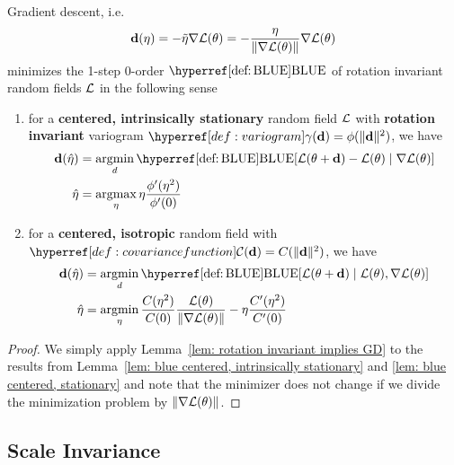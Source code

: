 \begin{theorem}\label{thm: bayesian descent}
	Gradient descent, i.e. 
	\begin{equation*}
		\mathbf{d}(\eta) = - \tilde{\eta} \nabla\mathcal{L}(\theta)
		= - \frac{\eta}{\|\nabla\mathcal{L}(\theta)\|} \nabla\mathcal{L}(\theta)
	\end{equation*}
	minimizes the 1-step 0-order \(\BLUE\) of rotation invariant random fields
	\(\mathcal{L}\) in the following sense
	\begin{enumerate}
		\item for a \textbf{centered, intrinsically stationary} random field
		\(\mathcal{L}\) with \textbf{rotation invariant} variogram \(\variogram(\step) =
		\phi(\|\step\|^2)\), we have
		\begin{align*}
			\step(\hat{\lr})
			&= \argmin_{d}
			\BLUE[\Loss(\param + \step) - \Loss(\param)\mid \nabla\Loss(\param)]\\
			\hat{\lr}
			&= \argmax_{\lr} \lr\frac{\phi'(\lr^2)}{\phi'(0)}
		\end{align*}


		\item for a \textbf{centered, isotropic} random field with
		\(\C(\step)=C(\|\step\|^2)\), we have
		\begin{align*}
			\step(\hat{\lr})
			&= \argmin_{d}
			\BLUE[\Loss(\param + \step)\mid \Loss(\param), \nabla\Loss(\param)]\\
			\hat{\lr}
			&= \argmin_{\lr}\frac{\sqC(\lr^2)}{\sqC(0)} \frac{\Loss(\param)}{\|\nabla\Loss(\param)\|}
		-  \lr\frac{\sqC'(\lr^2)}{\sqC'(0)}
		\end{align*}
	\end{enumerate}
\end{theorem}

\begin{proof}
	We simply apply Lemma~\ref{lem: rotation invariant implies GD}	to the results
	from Lemma~\ref{lem: blue centered, intrinsically stationary} and \ref{lem:
	blue centered, stationary} and note that the minimizer does not change if
	we divide the minimization problem by \(\|\nabla\mathcal{L}(\theta)\|\).
\end{proof}

\subsection{Scale Invariance}

